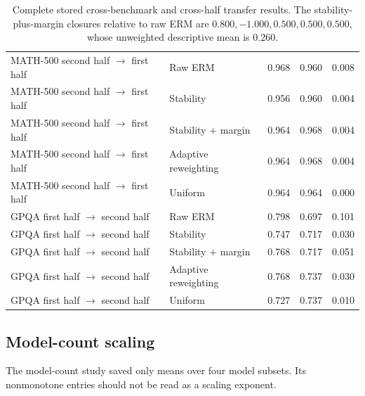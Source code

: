 \begin{table}[p]
\begin{tabular}{llrrr}
\midrule
MATH-500 second half \(\rightarrow\) first half & Raw ERM & 0.968 & 0.960 & 0.008 \\
MATH-500 second half \(\rightarrow\) first half & Stability & 0.956 & 0.960 & 0.004 \\
MATH-500 second half \(\rightarrow\) first half & Stability \(+\) margin & 0.964 & 0.968 & 0.004 \\
MATH-500 second half \(\rightarrow\) first half & Adaptive reweighting & 0.964 & 0.968 & 0.004 \\
MATH-500 second half \(\rightarrow\) first half & Uniform & 0.964 & 0.964 & 0.000 \\
\midrule
GPQA first half \(\rightarrow\) second half & Raw ERM & 0.798 & 0.697 & 0.101 \\
GPQA first half \(\rightarrow\) second half & Stability & 0.747 & 0.717 & 0.030 \\
GPQA first half \(\rightarrow\) second half & Stability \(+\) margin & 0.768 & 0.717 & 0.051 \\
GPQA first half \(\rightarrow\) second half & Adaptive reweighting & 0.768 & 0.737 & 0.030 \\
GPQA first half \(\rightarrow\) second half & Uniform & 0.727 & 0.737 & 0.010 \\
\bottomrule
\end{tabular}
\caption{Complete stored cross-benchmark and cross-half transfer results.  The stability-plus-margin closures relative to raw ERM are \(0.800,-1.000,0.500,0.500,0.500\), whose unweighted descriptive mean is \(0.260\).}
\label{tab:legacy-full-transfer}
\end{table}

\subsection{Model-count scaling}

The model-count study saved only means over four model subsets. Its nonmonotone entries should not be read as a scaling exponent.

